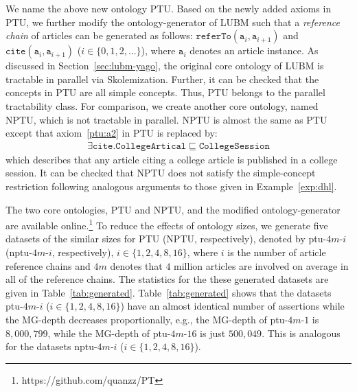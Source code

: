 We name the above new ontology PTU.
Based on the newly added axioms in PTU, we further modify the ontology-generator
of LUBM such that a \emph{reference chain} of articles can be generated as follows:
$\texttt{referTo}(\texttt{a}_i,\texttt{a}_{i+1})$ and
$\texttt{cite}(\texttt{a}_i,\texttt{a}_{i+1})$ ($i\in\{0,1,2,...\}$),
where $\texttt{a}_i$ denotes an article instance.
As discussed in Section~\ref{sec:lubm-yago},
the original core ontology of LUBM is tractable in parallel via
Skolemization. Further, it can be checked that the concepts in PTU
are all simple concepts. Thus, PTU belongs to the parallel tractability class.
For comparison, we create another core ontology, named NPTU, which
is not tractable in parallel. NPTU is almost the same as PTU except that
axiom~\ref{ptu:a2} in PTU is replaced by:
\begin{align}
\exists\texttt{cite}.\texttt{CollegeArtical}\sqsubseteq\texttt{CollegeSession}\label{nptu:a1}\tag{$\beta_4$}
\end{align}
which describes that any article citing a college article is published in a
college session.
It can be checked that NPTU does not satisfy the simple-concept
restriction following analogous arguments to those given in Example~\ref{exp:dhl}.

The two core ontologies, PTU and NPTU,
and the modified ontology-generator are available online.\footnote{https://github.com/quanzz/PT}
To reduce the effects of ontology sizes, we generate five datasets of
the similar sizes for PTU (NPTU, respectively), denoted by
ptu-$4m$-$i$ (nptu-$4m$-$i$, respectively), $i\in\{1,2,4,8,16\}$,
where $i$ is the number of article reference chains
and $4m$ denotes that $4$ million articles are involved on average in all of the reference chains.
The statistics for the these generated datasets are given in Table~\ref{tab:generated}.
Table~\ref{tab:generated} shows that the datasets ptu-$4m$-$i$ ($i\in\{1,2,4,8,16\}$)
have an almost identical number of assertions while the MG-depth
decreases proportionally, e.g., the MG-depth of ptu-$4m$-$1$ is
$8,000,799$, while the MG-depth of ptu-$4m$-$16$ is just
$500,049$. This is
analogous for the datasets nptu-$4m$-$i$ ($i\in\{1,2,4,8,16\}$).

